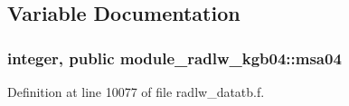 \subsection{Variable Documentation}
\subsubsection[{\texorpdfstring{msa04}{msa04}}]{\setlength{\rightskip}{0pt plus 5cm}integer, public module\+\_\+radlw\+\_\+kgb04\+::msa04}\hypertarget{namespacemodule__radlw__kgb04_ac8c5caff005fd04d01009dd9e977d570}{}\label{namespacemodule__radlw__kgb04_ac8c5caff005fd04d01009dd9e977d570}


Definition at line 10077 of file radlw\+\_\+datatb.\+f.

